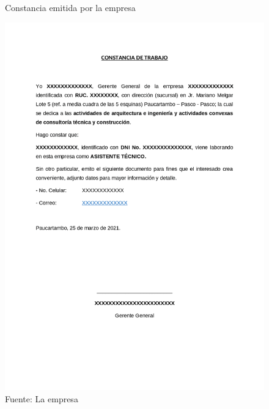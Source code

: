 \begin{figure}[H]
\centering
\caption[]{Constancia emitida por la empresa}
\includegraphics[width=1\linewidth]{E_IMAGENES/Anexos/Constancia_investigacion.png}
\caption*{Fuente: La empresa}
\label{fig:Anexo_C}
\end{figure}
